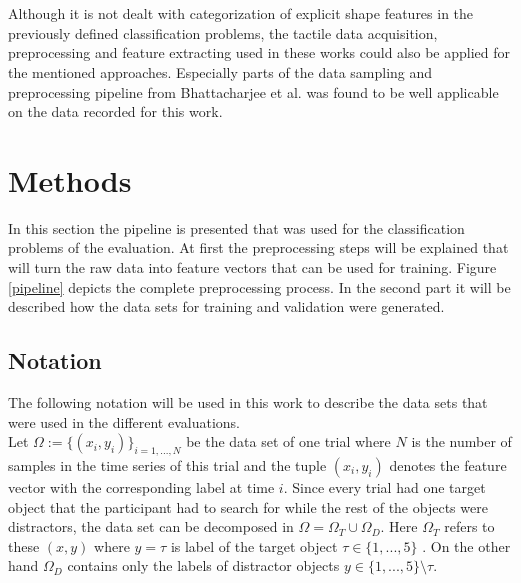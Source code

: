 \\\\
Although it is not dealt with categorization of explicit shape features in the previously defined classification problems, the tactile data acquisition, preprocessing and feature extracting used in these works could also be applied for the mentioned approaches. Especially parts of the data sampling and preprocessing pipeline from Bhattacharjee et al. \cite{Bhattacharjee} was found to be well applicable on the data recorded for this work.

\section{Methods}
In this section the pipeline is presented that was used for the classification problems of the evaluation. At first the preprocessing steps will be explained that will turn the raw data into feature vectors that can be used for training. Figure \ref{pipeline} depicts the complete preprocessing process. In the second part it will be described how the data sets for training and validation were generated.

\subsection{Notation}
The following notation will be used in this work to describe the data sets that were used in the different evaluations. \\
Let $ \Omega := \{(x_{i},y_{i})\}_{i=1,...,N} $ be the data set of one trial where $ N $ is the number of samples in the time series of this trial and the tuple $ (x_{i},y_{i}) $ denotes the feature vector with the corresponding label at time $ i $. Since every trial had one target object that the participant had to search for while the rest of the objects were distractors, the data set can be decomposed in $ \Omega = \Omega_{T} \cup \Omega_{D} $. Here $ \Omega_{T} $ refers to these $ (x,y) $ where $ y=\tau $ is label of the target object $ \tau \in \{1,...,5\} $ . On the other hand $ \Omega_{D} $ contains only the labels of distractor objects $ y \in \{1,...,5\}\setminus \tau $. %

